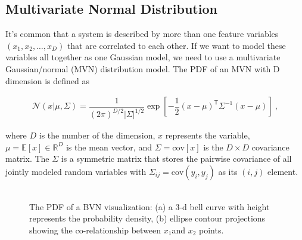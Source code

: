 \documentclass[preprint,12pt]{elsarticle}
\begin{document}
\subsection{Multivariate Normal Distribution}

It's common that a system is described by more than one feature variables $(x_1, x_2, \ldots, x_D)$ that are correlated to each other. If we want to model these variables all together as one Gaussian model, we need to use a multivariate Gaussian/normal (MVN) \cite{Murphy2012} distribution model. The PDF of an MVN with D dimension is defined as \cite{Murphy2012}
\begin{ceqn}
    \begin{align}
       \mathcal{N}(x | \mu,\Sigma) = \dfrac{1}{(2\pi)^{D/2}|\Sigma|^{1/2}}\exp\left[-\dfrac{1}{2}(x-\mu)^\mathsf{T} \Sigma^{-1}(x-\mu)\right] \ , \nonumber
    \end{align}
\end{ceqn}
where $D$ is the number of the dimension, $x$ represents the variable, $\mu=\mathbb{E}[x] \in \mathbb{R}^D$ is the mean vector, and $\Sigma=\text{cov}[x]$ is the $D \times D$ covariance matrix. The $\Sigma$ is a symmetric matrix that stores the pairwise covariance of all jointly modeled random variables with $\Sigma_{ij}=\text{cov}(y_i,y_j)$ as its $(i,j)$ element. 
\\
\\
\begin{figure}[h!]
    \centering
    \qquad
    \caption{The PDF of a BVN visualization: (a) a 3-d bell curve with height represents the probability density, (b) ellipse contour projections showing the co-relationship between $x_1$and $x_2$ points.}%
    \label{FIG:5}
\end{figure}
\end{document}
